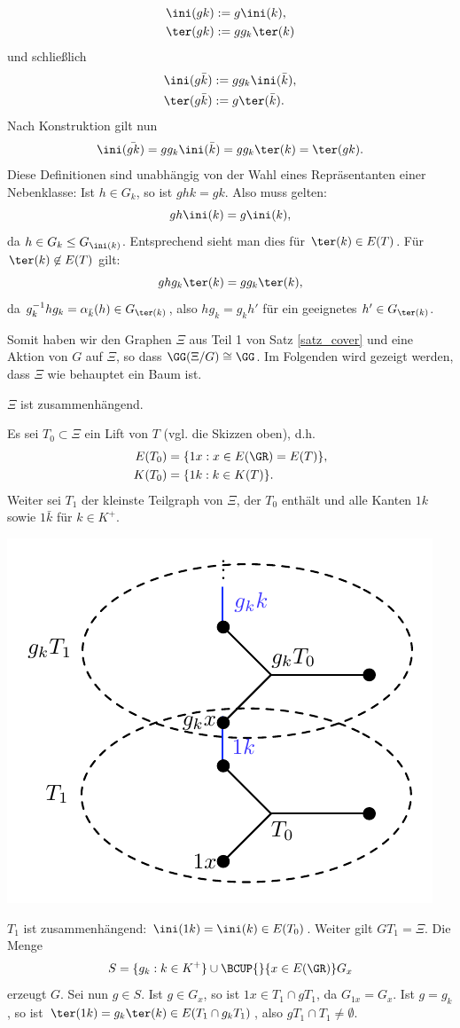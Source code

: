 \begin{align*}
\ini(gk) &:= g \ini(k), \\
\ter(gk) &:= g g_k \ter(k)
\end{align*}
und schließlich
\begin{align*}
\ini(g\bar{k}) &:= g g_k \ini(\bar{k}), \\
\ter(g \bar{k}) &:= g \ter(\bar{k}).
\end{align*}
Nach Konstruktion gilt nun
\[
\ini(\bar{gk}) = g g_k \ini(\bar{k}) = g g_k \ter(k)
= \ter(gk).
\]
Diese Definitionen sind unabhängig von der Wahl eines Repräsentanten
einer Nebenklasse: Ist $h\in G_k$, so ist $g h k = g k$.
Also muss gelten:
\[
g h \ini(k) = g \ini(k),
\]
da $h\in G_k \leq G_{\ini(k)}$. Entsprechend sieht man dies
für $\ter(k)\in E(T)$.
Für $\ter(k)\not\in E(T)$ gilt:
\[
g h g_k \ter(k) = g g_k \ter(k),
\]
da $ g_k^{-1} h g_k = \alpha_{\bar{k}}(h) \in G_{\ter(k)}$,
also $h g_k = g_k h'$ für ein geeignetes $h'\in G_{\ter(k)}$.

Somit haben wir den Graphen $\Xi$ aus Teil 1 von Satz \ref{satz_cover}
und eine Aktion von $G$ auf $\Xi$, so dass $\GG(\Xi/G)\cong \GG$.
Im Folgenden wird gezeigt werden, dass $\Xi$ wie behauptet ein Baum
ist.

\BEM $\Xi$ ist zusammenhängend.

\bew Es sei $T_0 \subset \Xi$ ein Lift von $T$ (vgl. die Skizzen 
oben), d.h.
\begin{align*}
E(T_0) &= \{ 1x : x\in E(\GR)=E(T) \}, \\
K(T_0) &= \{ 1k : k\in K(T) \}.
\end{align*}
Weiter sei $T_1$ der kleinste Teilgraph von $\Xi$, der $T_0$ enthält
und alle Kanten $1k$ sowie $1\bar{k}$ für $k\in K^+$.
\begin{center}
	\includegraphics{grugraImages/T0T1}
\end{center}
$T_1$ ist zusammenhängend: $\ini(1k)=\ini(k)\in E(T_0)$.
Weiter gilt  $GT_1 = \Xi$. Die Menge
\[
S = \{g_k : k\in K^+ \} \cup \BCUP{}{x\in E(\GR)} G_x
\]
erzeugt $G$. Sei nun $g\in S$. Ist $g \in G_x$, so ist
$1x \in T_1 \cap g T_1$, da $G_{1x}=G_x$.
Ist $g=g_k$, so ist $\ter(1k)=g_k \ter(k) \in E(T_1 \cap g_k T_1)$,
also $g T_1 \cap T_1 \neq \emptyset$.

